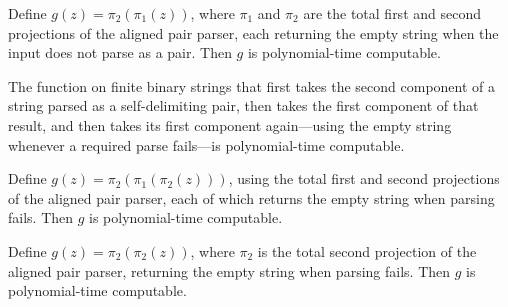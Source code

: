 \begin{theorem}
\label{Complexity.KarpLipton.polyTimeComputable_gU}
\leanok
{}
Define $g(z)=\pi_2(\pi_1(z))$, where $\pi_1$ and $\pi_2$ are the total first and second
projections of the aligned pair parser, each returning the empty string when the input
does not parse as a pair. Then $g$ is polynomial-time computable.
\end{theorem}

\begin{theorem}
\label{Complexity.KarpLipton.polyTimeComputable_gu}
\leanok
{}
The function on finite binary strings that first takes the second component of a string
parsed as a self-delimiting pair, then takes the first component of that result, and
then takes its first component again—using the empty string whenever a required parse
fails—is polynomial-time computable.
\end{theorem}

\begin{theorem}
\label{Complexity.KarpLipton.polyTimeComputable_gj}
\leanok
{}
Define $g(z)=\pi_2(\pi_1(\pi_2(z)))$, using the total first and second projections of
the aligned pair parser, each of which returns the empty string when parsing fails. Then
$g$ is polynomial-time computable.
\end{theorem}

\begin{theorem}
\label{Complexity.KarpLipton.polyTimeComputable_gp}
\leanok
{}
Define $g(z)=\pi_2(\pi_2(z))$, where $\pi_2$ is the total second projection of the
aligned pair parser, returning the empty string when parsing fails. Then $g$ is
polynomial-time computable.
\end{theorem}

